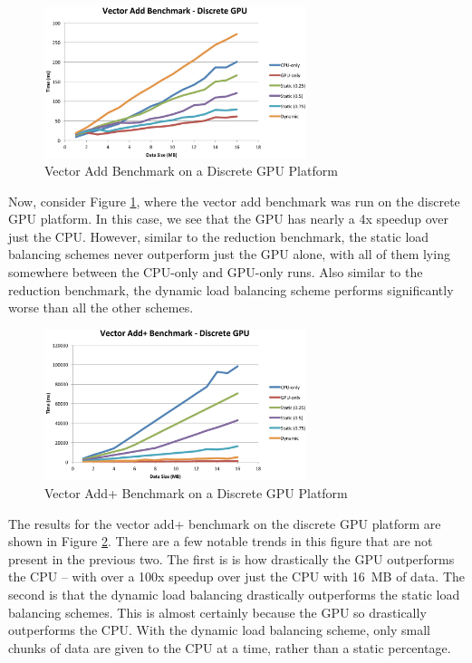 \documentclass[journal]{IEEEtran}
\begin{document}
\begin{figure}[t]
\centering
\includegraphics[width=3.0in]{vector_discrete}
\caption{Vector Add Benchmark on a Discrete GPU Platform}
\label{fig:vector_discrete}
\end{figure}

Now, consider Figure \ref{fig:vector_discrete}, where the vector add benchmark was run on
the discrete GPU platform.  In this case, we see that the GPU has nearly a 4x speedup over
just the CPU.  However, similar to the reduction benchmark, the static load balancing schemes
never outperform just the GPU alone, with all of them lying somewhere between the CPU-only
and GPU-only runs.  Also similar to the reduction benchmark, the dynamic load balancing scheme
performs significantly worse than all the other schemes.

\begin{figure}[t]
\centering
\includegraphics[width=3.0in]{vector_plus_discrete}
\caption{Vector Add+ Benchmark on a Discrete GPU Platform}
\label{fig:vector_plus_discrete}
\end{figure}

The results for the vector add+ benchmark on the discrete GPU platform are shown in Figure
\ref{fig:vector_plus_discrete}.  There are a few notable trends in this figure that are not
present in the previous two.  The first is is how drastically the GPU outperforms the CPU --
with over a 100x speedup over just the CPU with 16~MB of data.  The second is that the
dynamic load balancing drastically outperforms the static load balancing schemes.  This is
almost certainly because the GPU so drastically outperforms the CPU.  With the dynamic load
balancing scheme, only small chunks of data are given to the CPU at a time, rather than a
static percentage.
\end{document}
